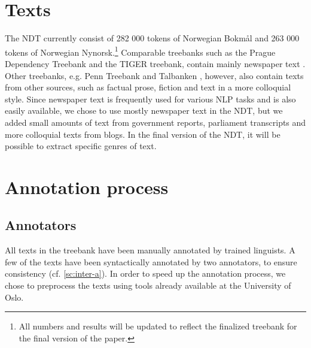 \documentclass[11pt,a4paper]{article}
\begin{document}

\section{Texts}
The NDT currently consist of 282 000 tokens of Norwegian Bokmål and 263 000 tokens of Norwegian Nynorsk.\footnote{All numbers and results will be updated to reflect the finalized treebank for the final version of the paper.} Comparable treebanks such as the Prague Dependency Treebank and the TIGER treebank, contain mainly newspaper text \cite{Boh:Haj:Hla:2003,Bra:2004}. Other treebanks, e.g. Penn Treebank and Talbanken \cite{Mar:San:Mar:93,Niv:Nil:Hal:2006}, however, also contain texts from other sources, such as factual prose, fiction and text in a more colloquial style. Since newspaper text is frequently used for various NLP tasks and is also easily available, we chose to use mostly newspaper text in the NDT, but we added small amounts of text from government reports, parliament transcripts and more colloquial texts from blogs. In the final version of the NDT, it will be possible to extract specific genres of text.



\section{Annotation process}
\subsection{Annotators}
All texts in the treebank have been manually annotated by trained linguists. A
few of the texts have been syntactically annotated by two annotators, to
ensure consistency (cf. \ref{sc:inter-a}). In order to speed up the annotation
process, we chose to preprocess the texts using tools already available at the
University of Oslo.
\end{document}
